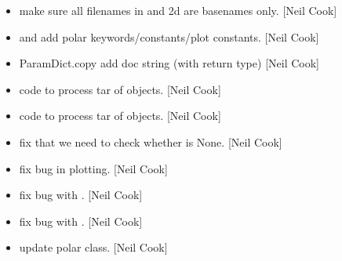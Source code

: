 \documentclass[a4paper,10pt,english]{report}
\begin{document}
\begin{itemize}
\item {} 
 \sphinxhyphen{} make sure all filenames in  and 2d
are basenames only. {[}Neil Cook{]}

\item {} 
 and  \sphinxhyphen{} add polar
keywords/constants/plot constants. {[}Neil Cook{]}

\item {} 
 \sphinxhyphen{} ParamDict.copy \sphinxhyphen{} add doc string
(with return type) {[}Neil Cook{]}

\item {} 
 \sphinxhyphen{} code to process tar of objects. {[}Neil Cook{]}

\item {} 
 \sphinxhyphen{} code to process tar of objects. {[}Neil Cook{]}

\item {} 
 \sphinxhyphen{} fix that we need to check whether
 is None. {[}Neil Cook{]}

\item {} 
 \sphinxhyphen{} fix bug in plotting. {[}Neil Cook{]}

\item {} 
 \sphinxhyphen{} fix bug with . {[}Neil
Cook{]}

\item {} 
 \sphinxhyphen{} fix bug with . {[}Neil
Cook{]}

\item {} 
 \sphinxhyphen{} update polar class. {[}Neil Cook{]}

\end{itemize}
\end{document}
